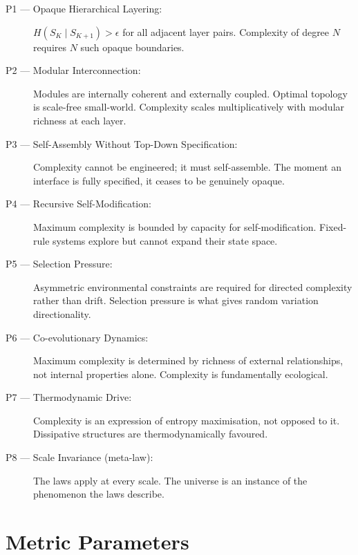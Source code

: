 \documentclass[12pt,a4paper]{article}
\begin{document}
\begin{description}
  \item[P1 — Opaque Hierarchical Layering:]
    $H(S_K \mid S_{K+1}) > \epsilon$ for all adjacent layer pairs.
    Complexity of degree $N$ requires $N$ such opaque boundaries.

  \item[P2 — Modular Interconnection:]
    Modules are internally coherent and externally coupled.
    Optimal topology is scale-free small-world.
    Complexity scales multiplicatively with modular richness at each layer.

  \item[P3 — Self-Assembly Without Top-Down Specification:]
    Complexity cannot be engineered; it must self-assemble.
    The moment an interface is fully specified, it ceases to be genuinely opaque.

  \item[P4 — Recursive Self-Modification:]
    Maximum complexity is bounded by capacity for self-modification.
    Fixed-rule systems explore but cannot expand their state space.

  \item[P5 — Selection Pressure:]
    Asymmetric environmental constraints are required for directed
    complexity rather than drift.
    Selection pressure is what gives random variation directionality.

  \item[P6 — Co-evolutionary Dynamics:]
    Maximum complexity is determined by richness of external relationships,
    not internal properties alone.
    Complexity is fundamentally ecological.

  \item[P7 — Thermodynamic Drive:]
    Complexity is an expression of entropy maximisation, not opposed to it.
    Dissipative structures are thermodynamically favoured.

  \item[P8 — Scale Invariance (meta-law):]
    The laws apply at every scale.
    The universe is an instance of the phenomenon the laws describe.
\end{description}

\section{Metric Parameters}
\end{document}
